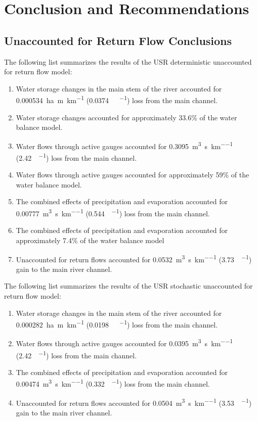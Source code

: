 \chapter{Conclusion and Recommendations}
\label{chap:Conclusion}

\begin{linenumbers}
\section{Unaccounted for Return Flow Conclusions}
\label{sec:ReturnFlowConclusions}

The following list summarizes the results of the USR deterministic unaccounted for return flow model:
\begin{enumerate}
	\item Water storage changes in the main stem of the river accounted for \SI{0.000534}{\hectare\m\per\kilo\meter} (\SI{0.0374}{\acre\foot\per\mile}) loss from the main channel.
	\item Water storage changes accounted for approximately 33.6\% of the water balance model.
	\item Water flows through active gauges accounted for \SI{0.3095}{\cubic\m\per\second\per\kilo\meter} (\SI{2.42}{\cfs\per\mile}) loss from the main channel.
	\item Water flows through active gauges accounted for approximately 59\% of the water balance model.
	\item The combined effects of precipitation and evaporation accounted for \SI{0.00777}{\cubic\m\per\second\per\kilo\meter} (\SI{0.544}{\cfs\per\mile}) loss from the main channel.
	\item The combined effects of precipitation and evaporation accounted for approximately 7.4\% of the water balance model
	\item Unaccounted for return flows accounted for \SI{0.0532}{\cubic\m\per\second\per\kilo\meter} (\SI{3.73}{\cfs\per\mile}) gain to the main river channel.
\end{enumerate}

The following list summarizes the results of the USR stochastic unaccounted for return flow model:
\begin{enumerate}
	\item Water storage changes in the main stem of the river accounted for \SI{0.000282}{\hectare\m\per\kilo\meter} (\SI{0.0198}{\acre\foot\per\mile}) loss from the main channel.
	\item Water flows through active gauges accounted for \SI{0.0395}{\cubic\m\per\second\per\kilo\meter} (\SI{2.42}{\cfs\per\mile}) loss from the main channel.
	\item The combined effects of precipitation and evaporation accounted for \SI{0.00474}{\cubic\m\per\second\per\kilo\meter} (\SI{0.332}{\cfs\per\mile}) loss from the main channel.
	\item Unaccounted for return flows accounted for \SI{0.0504}{\cubic\m\per\second\per\kilo\meter} (\SI{3.53}{\cfs\per\mile}) gain to the main river channel.
\end{enumerate}


\end{linenumbers}
